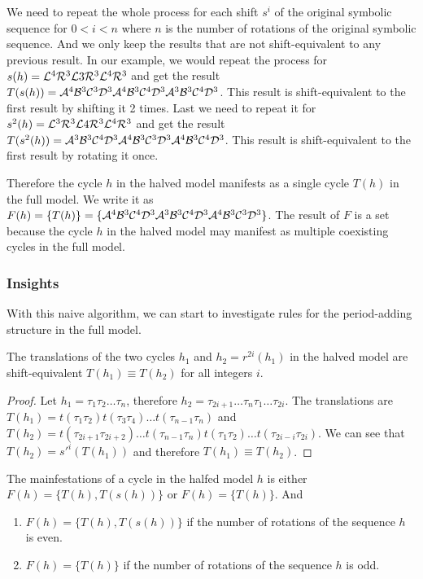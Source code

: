 We need to repeat the whole process for each shift $s^i$ of the original symbolic sequence for $0 < i < n$ where $n$ is the number of rotations of the original symbolic sequence.
And we only keep the results that are not shift-equivalent to any previous result.
In our example, we would repeat the process for $s(h) = \mathcal{L}^4\mathcal{R}^3\mathcal{L}3\mathcal{R}^3\mathcal{L}^4\mathcal{R}^3$ and get the result $T(s(h)) = \mathcal{A}^4\mathcal{B}^3\mathcal{C}^3\mathcal{D}^3\mathcal{A}^4\mathcal{B}^3\mathcal{C}^4\mathcal{D}^3\mathcal{A}^3\mathcal{B}^3\mathcal{C}^4\mathcal{D}^3$.
This result is shift-equivalent to the first result by shifting it 2 times.
Last we need to repeat it for $s^2(h) = \mathcal{L}^3\mathcal{R}^3\mathcal{L}4\mathcal{R}^3\mathcal{L}^4\mathcal{R}^3$ and get the result $T(s^2(h)) = \mathcal{A}^3\mathcal{B}^3\mathcal{C}^4\mathcal{D}^3\mathcal{A}^4\mathcal{B}^3\mathcal{C}^3\mathcal{D}^3\mathcal{A}^4\mathcal{B}^3\mathcal{C}^4\mathcal{D}^3$.
This result is shift-equivalent to the first result by rotating it once.

Therefore the cycle $h$ in the halved model manifests as a single cycle $T(h)$ in the full model.
We write it as $F(h) = \{T(h)\} = \{\mathcal{A}^4\mathcal{B}^3\mathcal{C}^4\mathcal{D}^3\mathcal{A}^3\mathcal{B}^3\mathcal{C}^4\mathcal{D}^3\mathcal{A}^4\mathcal{B}^3\mathcal{C}^3\mathcal{D}^3\}$.
The result of $F$ is a set because the cycle $h$ in the halved model may manifest as multiple coexisting cycles in the full model.

\subsubsection{Insights}

With this naive algorithm, we can start to investigate rules for the period-adding structure in the full model.

\begin{lemma}
    \label{lemma:equivalence.translations}
    The translations of the two cycles $h_1$ and $h_2 = r^{2i}(h_1)$ in the halved model are shift-equivalent $T(h_1) \equiv T(h_2)$ for all integers $i$.
\end{lemma}

\begin{proof}
    Let $h_1 = \tau_1\tau_2 \dots \tau_n$, therefore $h_2 = \tau_{2i+1} \dots \tau_n\tau_1 \dots \tau_{2i}$.
    The translations are $T(h_1) = t(\tau_1\tau_2)t(\tau_3\tau_4) \dots t(\tau_{n-1}\tau_n)$
    and $T(h_2) = t(\tau_{2i+1}\tau_{2i+2}) \dots t(\tau_{n-1}\tau_n)t(\tau_1\tau_2) \dots t(\tau_{2i-i}\tau_{2i})$.
    We can see that $T(h_2) = s'^i(T(h_1))$ and therefore $T(h_1) \equiv T(h_2)$.
\end{proof}

\begin{theorem}
    \label{theorem:coexistence.even}
    The mainfestations of a cycle in the halfed model $h$ is either $F(h) = \{T(h), T(s(h))\}$ or $F(h) = \{T(h)\}$.
    And \begin{enumerate}
        \item $F(h) = \{T(h), T(s(h))\}$ if the number of rotations of the sequence $h$ is even.
        \item $F(h) = \{T(h)\}$ if the number of rotations of the sequence $h$ is odd.
    \end{enumerate}
\end{theorem}

